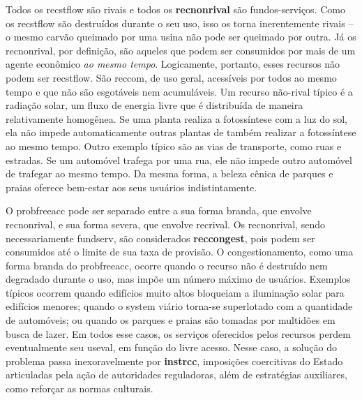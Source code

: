 \documentclass[./main.tex]{subfiles}
\begin{document}
\par Todos os \gls{recstflow} são rivais e todos os \textbf{\gls{recnonrival}} são fundos-serviços. Como os \gls{recstflow} são destruídos durante o seu uso, isso os torna inerentemente rivais -- o mesmo carvão queimado por uma usina não pode ser queimado por outra. Já os \gls{recnonrival}, por definição, são aqueles que podem ser consumidos por mais de um agente econômico \textit{ao mesmo tempo}. Logicamente, portanto, esses recursos não podem ser \gls{recstflow}. São \gls{reccom}, de uso geral, acessíveis por todos ao mesmo tempo e que não são esgotáveis nem acumuláveis. Um recurso não-rival típico é a radiação solar, um fluxo de energia livre que é distribuída de maneira relativamente homogênea. Se uma planta realiza a fotossíntese com a luz do sol, ela não impede automaticamente outras plantas de também realizar a fotossíntese ao mesmo tempo. Outro exemplo típico são as vias de transporte, como ruas e estradas. Se um automóvel trafega por uma rua, ele não impede outro automóvel de trafegar ao mesmo tempo. Da mesma forma, a beleza cênica de parques e praias oferece bem-estar aos seus usuários indistintamente.

\par O \gls{probfreeacc} pode ser separado entre a sua forma branda, que envolve \gls{recnonrival}, e sua forma severa, que envolve \gls{recrival}. Os \gls{recnonrival}, sendo necessariamente \gls{fundserv}, são considerados \textbf{\gls{reccongest}}, pois podem ser consumidos até o limite de sua taxa de provisão. O congestionamento, como uma forma branda do \gls{probfreeacc}, ocorre quando o recurso não é destruído nem degradado durante o uso, mas impõe um número máximo de usuários. Exemplos típicos ocorrem quando edifícios muito altos bloqueiam a iluminação solar para edifícios menores; quando o \gls{system} viário torna-se superlotado com a quantidade de automóveis; ou quando os parques e praias são tomadas por multidões em busca de lazer. Em todos esse casos, os serviços oferecidos pelos recursos perdem eventualmente seu \gls{useval}, em função do livre acesso. Nesse caso, a solução do problema passa inexoravelmente por \textbf{\gls{instrcc}}, imposições coercitivas do Estado articuladas pela ação de autoridades reguladoras, além de estratégias auxiliares, como reforçar as normas culturais. 
\end{document}
